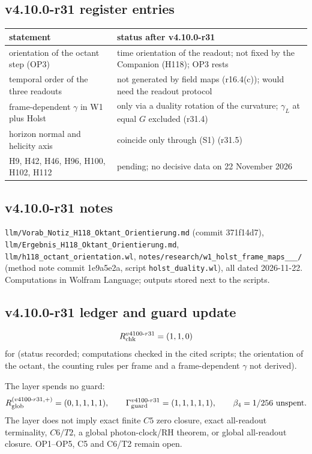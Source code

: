 \subsection*{v4.10.0-r31 register entries}
\label{subsec:v4100-r31-register}

\begin{center}
\small
\begin{tabular}{@{}>{\raggedright\arraybackslash}p{}>{\raggedright\arraybackslash}p{}@{}}
\toprule
statement & status after v4.10.0-r31\\
\midrule
orientation of the octant step (OP3) & time orientation of the readout; not fixed by the Companion (H118); OP3 rests\\
temporal order of the three readouts & not generated by field maps (r16.4(c)); would need the readout protocol\\
frame-dependent \(\gamma\) in W1 plus Holst & only via a duality rotation of the curvature; \(\gamma_L\) at equal \(G\) excluded (r31.4)\\
horizon normal and helicity axis & coincide only through (S1) (r31.5)\\
H9, H42, H46, H96, H100, H102, H112 & pending; no decisive data on 22 November 2026\\
\bottomrule
\end{tabular}
\end{center}

\subsection*{v4.10.0-r31 notes}
\label{subsec:v4100-r31-notes}

\texttt{llm/\allowbreak Vorab\_\allowbreak Notiz\_\allowbreak H118\_\allowbreak Oktant\_\allowbreak Orientierung.md} (commit 371f14d7),
\texttt{llm/\allowbreak Ergebnis\_\allowbreak H118\_\allowbreak Oktant\_\allowbreak Orientierung.md}, \texttt{llm/\allowbreak h118\_\allowbreak octant\_\allowbreak orientation.wl},
\texttt{notes/\allowbreak research/\allowbreak w1\_\allowbreak holst\_\allowbreak frame\_\allowbreak maps\_\_\_/} (method note commit 1e9a5e2a,
script \texttt{holst\_\allowbreak duality.wl}), all dated 2026-11-22.  Computations in Wolfram Language; outputs stored next to the scripts.

\subsection*{v4.10.0-r31 ledger and guard update}
\label{subsec:v4100-r31-ledger-guard}

\[
R_{\rm chk}^{v4100\text{-}r31}=(1,1,0)
\]
for (status recorded; computations checked in the cited scripts; the orientation of the octant, the counting rules per frame and a
frame-dependent \(\gamma\) not derived).

The layer spends no guard:
\[
R_{\rm glob}^{(v4100\text{-}r31,+)}=(0,1,1,1,1),
\qquad
\Gamma_{\rm guard}^{v4100\text{-}r31}=(1,1,1,1,1),
\qquad
\beta_4=1/256\ \text{unspent}.
\]
The layer does not imply exact finite \(C5\) zero closure, exact all-readout terminality, \(C6/T2\), a global photon-clock/RH theorem,
or global all-readout closure.  OP1--OP5, C5 and C6/T2 remain open.

